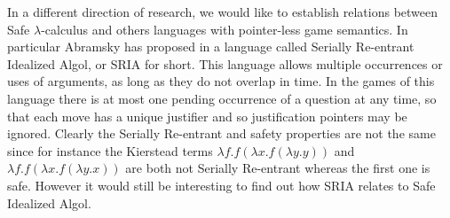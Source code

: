 In a different direction of research, we would like to establish relations between
Safe $\lambda$-calculus and others languages with pointer-less game semantics.
In particular Abramsky has proposed in \cite{abramsky:mchecking_ia} a language
called Serially Re-entrant Idealized Algol, or SRIA for short. This
language allows multiple occurrences or uses of arguments, as long
as they do not overlap in time. In the games of this language there
is at most one pending occurrence of a question at any time, so that
each move has a unique justifier and so justification pointers may
be ignored.
Clearly the Serially Re-entrant and safety properties are not the same since for instance the Kierstead terms
$\lambda f . f (\lambda x . f (\lambda y .y ))$ and
$\lambda f . f (\lambda x . f (\lambda y .x ))$ are both not Serially Re-entrant whereas the first one is safe.
However it would still be interesting to find out how SRIA relates to Safe Idealized Algol.
